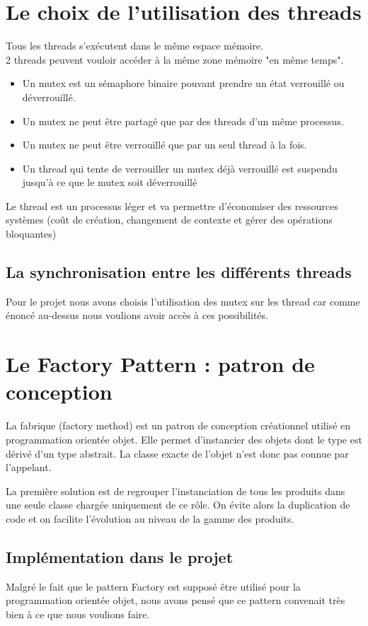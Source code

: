 \documentclass{report}
\begin{document}
\section{Le choix de l'utilisation des threads}
Tous les threads s'exécutent dans le même espace mémoire.\\
2 threads peuvent vouloir accéder à la même zone mémoire "en même
temps".
\begin{itemize}
\item Un mutex est un sémaphore binaire pouvant prendre un état verrouillé ou
déverrouillé.
\item Un mutex ne peut être partagé que par des threads d'un même processus.
\item Un mutex ne peut être verrouillé que par un seul thread à la fois.
\item Un thread qui tente de verrouiller un mutex déjà verrouillé est suspendu jusqu'à ce
que le mutex soit déverrouillé
\end{itemize}


Le thread est un processus léger et va permettre d'économiser des ressources systèmes (coût de création, changement de contexte et gérer des opérations bloquantes)

\subsection{La synchronisation entre les différents threads}
Pour le projet nous avons choisis l'utilisation des mutex sur les thread car comme énoncé au-dessus nous voulions avoir accès à ces possibilités.

\section{Le Factory Pattern : patron de conception}
La fabrique (factory method) est un patron de conception créationnel utilisé en programmation orientée objet. Elle permet d'instancier des objets dont le type est dérivé d'un type abstrait. La classe exacte de l'objet n'est donc pas connue par l'appelant.


La première solution est de regrouper l'instanciation de tous les produits dans une seule classe chargée uniquement de ce rôle. On évite alors la duplication de code et on facilite l'évolution au niveau de la gamme des produits.
\subsection{Implémentation dans le projet}
Malgré le fait que le pattern Factory est supposé être utilisé pour la programmation orientée objet, nous avons pensé que ce pattern convenait très bien à ce que nous voulions faire.
\end{document}
